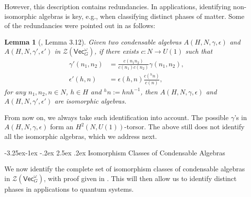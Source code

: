 \documentclass[aps,twocolumn,prx,floatfix,preprintnumbers, nofootinbib,10pt]{revtex4-2}
\makeatletter
\numberwithin{equation}{section}
\newtheorem{lemma}[theorem]{Lemma}
\theoremstyle{definition}
\newcommand{\cZ}{\mathcal{Z}}
\renewcommand{\Vec}{\mathsf{Vec}}
\newcommand{\eps}{\epsilon}
\renewcommand\subsubsection{\@startsection{subsubsection}{3}{\z@}%
                                     {-3.25ex\@plus -1ex \@minus -.2ex}%
                                     {2.5ex \@plus .2ex}%
                                     {\centering\itshape\bfseries\small}}
\makeatother
\begin{document}
However, this description contains redundancies. In applications, identifying non-isomorphic algebras is key, e.g., when classifying distinct phases of matter. 
Some of the redundancies were pointed out in \cite{davydov2017lagrangian} as follows:
\begin{lemma}[\cite{davydov2017lagrangian}, Lemma 3.12]
\label{lem:DS-isom-gamma-epsilon}
    Given two condensable algebras $A(H,N, \gamma,\epsilon)$ and $A(H,N,\gamma',\epsilon')$ in $\cZ(\Vec_G^\omega)$, if there exists $c:N \rightarrow U(1)$ such that
    \begin{align}
        \gamma'(n_1,n_2) &= \frac{c(n_1 n_2)}{c(n_1)c(n_2)} \gamma(n_1,n_2), \label{eqn:isom_alg_gamma}\\
        \epsilon'(h,n) & = \epsilon(h,n)\frac{c({}^{h}n)}{c(n)}, \label{eqn:isom_alg_epsilon}
    \end{align}
    for any $n_1,n_2,n\in N$, $h\in H$ and ${}^{h}n:=hnh^{-1}$,
    then $A(H,N, \gamma,\epsilon)$ and $A(H,N,\gamma',\epsilon')$ are isomorphic algebras.
\end{lemma}
From now on, we always take such identification into account. The possible $\gamma$'s in $A(H,N,\gamma,\eps)$ form an $H^2(N, U(1))$-torsor. The above still does not identify all the isomorphic algebras, which we address next.


\subsubsection{Isomorphism Classes of Condensable Algebras}
\label{sec:IsomAlg}

We now identify the complete set of isomorphism classes of condensable algebras in $\cZ(\Vec_G^\omega)$, with proof given in . This will then allow us to identify distinct phases in applications to quantum systems. 
\end{document}
